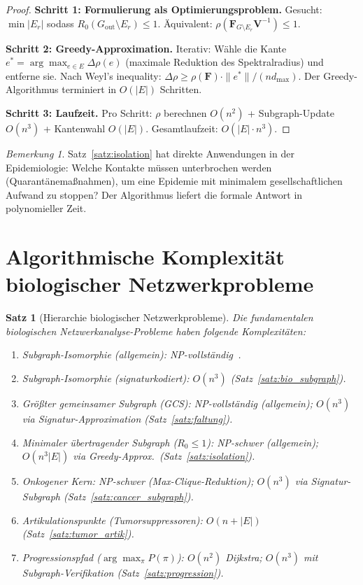 ﻿\documentclass[a4paper,12pt]{article}
\theoremstyle{plain}
\newtheorem{satz}{Satz}
\theoremstyle{definition}
\theoremstyle{remark}
\newtheorem{bemerkung}{Bemerkung}
\begin{document}
\begin{proof}
\textbf{Schritt 1: Formulierung als Optimierungsproblem.}
Gesucht: $\min |E_r|$ sodass $R_0(G_{\mathrm{out}} \setminus E_r) \leq 1$.
\"Aquivalent: $\rho(\mathbf{F}_{G \setminus E_r}\mathbf{V}^{-1}) \leq 1$.

\textbf{Schritt 2: Greedy-Approximation.}
Iterativ: W\"ahle die Kante $e^* = \arg\max_{e \in E} \Delta\rho(e)$
(maximale Reduktion des Spektralradius) und entferne sie.
Nach Weyl's inequality: $\Delta\rho \geq \rho(\mathbf{F})\cdot \|e^*\|/(nd_{\max})$.
Der Greedy-Algorithmus terminiert in $O(|E|)$ Schritten.

\textbf{Schritt 3: Laufzeit.}
Pro Schritt: $\rho$ berechnen $O(n^2)$ + Subgraph-Update $O(n^3)$ + Kantenwahl $O(|E|)$.
Gesamtlaufzeit: $O(|E| \cdot n^3)$.
\end{proof}

\begin{bemerkung}
Satz~\ref{satz:isolation} hat direkte Anwendungen in der Epidemiologie:
Welche Kontakte m\"ussen unterbrochen werden (Quarant\"anema{\ss}nahmen),
um eine Epidemie mit minimalem gesellschaftlichen Aufwand zu stoppen?
Der Algorithmus liefert die formale Antwort in polynomieller Zeit.
\end{bemerkung}

\section{Algorithmische Komplexit\"at biologischer Netzwerkprobleme}

\begin{satz}[Hierarchie biologischer Netzwerkprobleme]
\label{satz:hierarchie_kompl}
Die fundamentalen biologischen Netzwerkanalyse-Probleme haben folgende
Komplexit\"aten:
\begin{enumerate}[label=(\roman*)]
    \item Subgraph-Isomorphie (allgemein): NP-vollst\"andig~\cite{cook1971}.
    \item Subgraph-Isomorphie (signaturkodiert): $O(n^3)$ (Satz~\ref{satz:bio_subgraph}).
    \item Gr\"o{\ss}ter gemeinsamer Subgraph (GCS): NP-vollst\"andig (allgemein);
          $O(n^3)$ via Signatur-Approximation (Satz~\ref{satz:faltung}).
    \item Minimaler \"ubertragender Subgraph ($R_0 \leq 1$): NP-schwer (allgemein);
          $O(n^3 |E|)$ via Greedy-Approx.\ (Satz~\ref{satz:isolation}).
    \item Onkogener Kern: NP-schwer (Max-Clique-Reduktion);
          $O(n^3)$ via Signatur-Subgraph (Satz~\ref{satz:cancer_subgraph}).
    \item Artikulationspunkte (Tumorsuppressoren): $O(n + |E|)$ (Satz~\ref{satz:tumor_artik}).
    \item Progressionspfad ($\arg\max_\pi P(\pi)$): $O(n^2)$ Dijkstra;
          $O(n^3)$ mit Subgraph-Verifikation (Satz~\ref{satz:progression}).
\end{enumerate}
\end{satz}
\end{document}
